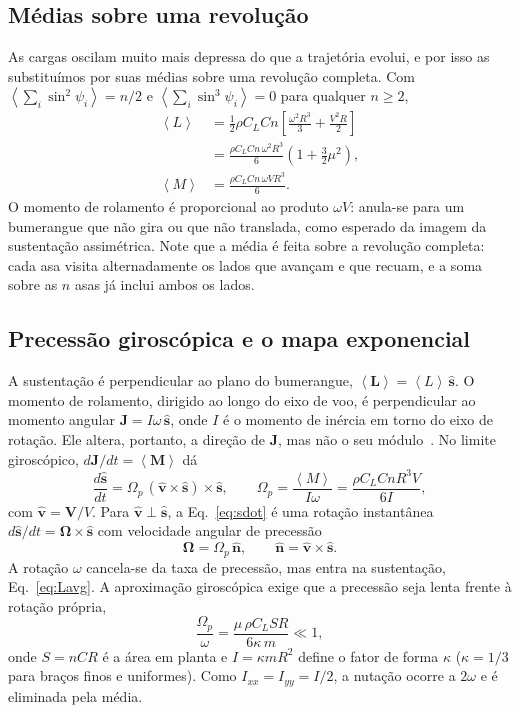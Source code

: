 \documentclass[aps,pre,twocolumn,superscriptaddress,nofootinbib,floatfix]{revtex4-2}
\newcommand{\vect}[1]{\bm{#1}}
\newcommand{\uv}[1]{\hat{\bm{#1}}}
\newcommand{\avg}[1]{\left\langle #1 \right\rangle}
\begin{document}
\subsection{Médias sobre uma revolução}

As cargas oscilam muito mais depressa do que a trajetória evolui, e por isso as substituímos por suas médias sobre uma revolução completa. Com $\avg{\sum_i\sin^2\psi_i}=n/2$ e $\avg{\sum_i\sin^3\psi_i}=0$ para qualquer $n\geq2$,
\begin{align}
  \avg{L} &= \tfrac12\rho C_L C n\left[\frac{\omega^2R^3}{3}+\frac{V^2R}{2}\right] \nonumber\\
  &= \frac{\rho C_L C n\,\omega^2R^3}{6}\left(1+\frac32\mu^2\right),
  \label{eq:Lavg}\\
  \avg{M} &= \frac{\rho C_L C n\,\omega V R^3}{6}.
  \label{eq:Mavg}
\end{align}
O momento de rolamento é proporcional ao produto $\omega V$: anula-se para um bumerangue que não gira ou que não translada, como esperado da imagem da sustentação assimétrica. Note que a média é feita sobre a revolução completa: cada asa visita alternadamente os lados que avançam e que recuam, e a soma sobre as $n$ asas já inclui ambos os lados.

\subsection{Precessão giroscópica e o mapa exponencial}

A sustentação é perpendicular ao plano do bumerangue, $\avg{\vect L}=\avg{L}\,\uv s$. O momento de rolamento, dirigido ao longo do eixo de voo, é perpendicular ao momento angular $\vect J=I\omega\,\uv s$, onde $I$ é o momento de inércia em torno do eixo de rotação. Ele altera, portanto, a direção de $\vect J$, mas não o seu módulo~\cite{goldstein2002}. No limite giroscópico, $d\vect J/dt=\avg{\vect M}$ dá
\begin{equation}
  \frac{d\uv s}{dt} = \Omega_p\,(\uv v\times\uv s)\times\uv s,
  \qquad
  \Omega_p = \frac{\avg{M}}{I\omega} = \frac{\rho C_L C n R^3 V}{6I},
  \label{eq:sdot}
\end{equation}
com $\uv v=\vect V/V$. Para $\uv v\perp\uv s$, a Eq.~\eqref{eq:sdot} é uma rotação instantânea $d\uv s/dt=\vect\Omega\times\uv s$ com velocidade angular de precessão
\begin{equation}
  \vect\Omega = \Omega_p\,\uv n, \qquad \uv n = \uv v\times\uv s .
  \label{eq:Omegavec}
\end{equation}
A rotação $\omega$ cancela-se da taxa de precessão, mas entra na sustentação, Eq.~\eqref{eq:Lavg}. A aproximação giroscópica exige que a precessão seja lenta frente à rotação própria,
\begin{equation}
  \frac{\Omega_p}{\omega} = \frac{\mu\,\rho C_L S R}{6\kappa\, m} \ll 1,
  \label{eq:gyro}
\end{equation}
onde $S=nCR$ é a área em planta e $I=\kappa mR^2$ define o fator de forma $\kappa$ ($\kappa=1/3$ para braços finos e uniformes). Como $I_{xx}=I_{yy}=I/2$, a nutação ocorre a $2\omega$ e é eliminada pela média.
\end{document}
